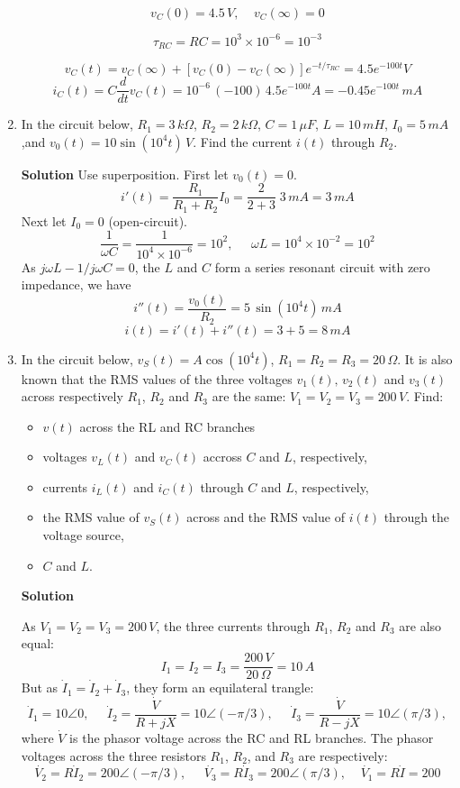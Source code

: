 \begin{enumerate}
  \[
  v_C(0)=4.5\,V,\;\;\;\;v_C(\infty)=0
  \]

  \[
  \tau_{RC}=RC=10^3\times 10^{-6}=10^{-3}
  \]
  
  \[
  v_C(t)=v_C(\infty)+[v_C(0)-v_C(\infty)]e^{-t/\tau_{RC}}=4.5 e^{-100 t}V
  \]
  \[
  i_C(t)=C\frac{d}{dt}v_C(t)=10^{-6}\,(-100)\, 4.5e^{-100t} A=-0.45 e^{-100t}\,mA
  \]


\item In the circuit below, $R_1=3\,k\Omega$, $R_2=2\,k\Omega$, $C=1\,\mu F$, 
  $L=10\,mH$, $I_0=5\,mA$,and $v_0(t)=10\sin(10^4t)\,V$. Find the 
  current $i(t)$ through $R_2$.

    
  {\bf Solution} Use superposition. First let $v_0(t)=0$. 
  \[
  i'(t)=\frac{R_1}{R_1+R_2}I_0=\frac{2}{2+3}\;3\,mA=3\,mA
  \]
  Next let $I_0=0$ (open-circuit). 
  \[
  \frac{1}{\omega C}=\frac{1}{10^4\times 10^{-6}}=10^2,
  \;\;\;\;\;
  \omega L=10^4\times 10^{-2}=10^2
  \]
  As $j\omega L-1/j\omega C=0$, the $L$ and $C$ form a series resonant
  circuit with zero impedance, we have
  \[
  i''(t)=\frac{v_0(t)}{R_2}=5\,\sin(10^4t)\,mA
  \]
  \[
  i(t)=i'(t)+i''(t)=3+5=8\,mA
  \]

\item In the circuit below, $v_S(t)=A\cos(10^4 t)$, $R_1=R_2=R_3=20\,\Omega$.
  It is also known that the RMS values of the three voltages $v_1(t),\,v_2(t)$ 
  and $v_3(t)$ across respectively $R_1$, $R_2$ and $R_3$ are the same: 
  $V_1=V_2=V_3=200\,V$. Find:
  \begin{itemize}
    \item $v(t)$ across the RL and RC branches
    \item voltages $v_L(t)$ and $v_C(t)$ accross $C$ and $L$, respectively,
    \item currents $i_L(t)$ and $i_C(t)$ through $C$ and $L$, respectively,
    \item the RMS value of $v_S(t)$ across and the RMS value of $i(t)$ through 
      the voltage source,
    \item $C$ and $L$.
  \end{itemize}

    
  {\bf Solution} 
  
  As $V_1=V_2=V_3=200\,V$, the three currents through $R_1$, $R_2$ and 
  $R_3$ are also equal:
  \[
  I_1=I_2=I_3=\frac{200\,V}{20\,\Omega}=10\,A
  \]
  But as $\dot{I}_1=\dot{I}_2+\dot{I}_3$, they form an equilateral trangle:
  \[
  \dot{I}_1=10\angle 0,\;\;\;\;\;
  \dot{I}_2=\frac{\dot{V}}{R+jX}=10\angle (-\pi/3),\;\;\;\;\; 
  \dot{I}_3=\frac{\dot{V}}{R-jX}=10\angle (\pi/3),
  \]
  where $\dot{V}$ is the phasor voltage across the RC and RL branches.
  The phasor voltages across the three resistors $R_1$, $R_2$, and $R_3$
  are respectively:
  \[
  \dot{V_2}=R\dot{I}_2=200\angle (-\pi/3),\;\;\;\;\; 
  \dot{V_3}=R\dot{I}_3=200\angle (\pi/3),\;\;\;\;
  \dot{V_1}=R\dot{I}=200
  \]


\end{enumerate}
